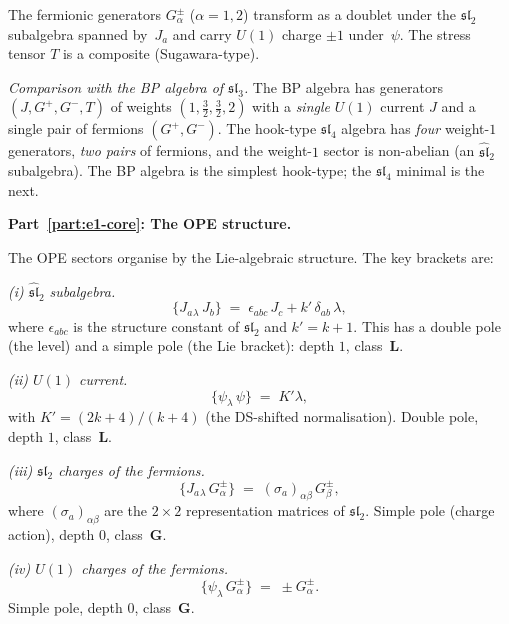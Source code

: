 \begin{computation}
The fermionic generators $G^\pm_\alpha$ ($\alpha = 1, 2$)
transform as a doublet under the $\mathfrak{sl}_2$
subalgebra spanned by~$J_a$ and carry $U(1)$ charge
$\pm 1$ under~$\psi$. The stress tensor $T$ is
a composite (Sugawara-type).

\emph{Comparison with the BP algebra of $\mathfrak{sl}_3$.}
The BP algebra has generators $(J, G^+, G^-, T)$ of
weights $(1, \frac32, \frac32, 2)$ with a \emph{single}
$U(1)$ current $J$ and a single pair of fermions
$(G^+, G^-)$. The hook-type $\mathfrak{sl}_4$ algebra
has \emph{four} weight-$1$ generators, \emph{two pairs}
of fermions, and the weight-$1$ sector is non-abelian
(an $\widehat{\mathfrak{sl}}_2$ subalgebra). The
BP algebra is the simplest hook-type; the
$\mathfrak{sl}_4$ minimal is the next.

\medskip
\noindent\textbf{Part~\ref{part:e1-core}: The OPE structure.}

The OPE sectors organise by the Lie-algebraic
structure. The key brackets are:

\smallskip
\noindent\emph{(i) $\widehat{\mathfrak{sl}}_2$ subalgebra.}
\begin{equation}\label{eq:sl4hook-JJ}
\{J_a{}_\lambda\, J_b\}
\;=\;
\epsilon_{abc}\, J_c
+ k'\,\delta_{ab}\,\lambda,
\end{equation}
where $\epsilon_{abc}$ is the structure constant of
$\mathfrak{sl}_2$ and $k' = k + 1$. This has a
double pole (the level) and a simple pole (the Lie
bracket): depth $1$, class~$\mathbf{L}$.

\smallskip
\noindent\emph{(ii) $U(1)$ current.}
\begin{equation}\label{eq:sl4hook-psipsi}
\{\psi_\lambda\, \psi\}
\;=\;
K'\lambda,
\end{equation}
with $K' = (2k+4)/(k+4)$ (the DS-shifted normalisation).
Double pole, depth $1$, class~$\mathbf{L}$.

\smallskip
\noindent\emph{(iii) $\mathfrak{sl}_2$ charges of the
fermions.}
\begin{equation}\label{eq:sl4hook-JG}
\{J_a{}_\lambda\, G^\pm_\alpha\}
\;=\;
(\sigma_a)_{\alpha\beta}\, G^\pm_\beta,
\end{equation}
where $(\sigma_a)_{\alpha\beta}$ are the $2\times 2$
representation matrices of $\mathfrak{sl}_2$.
Simple pole (charge action), depth $0$,
class~$\mathbf{G}$.

\smallskip
\noindent\emph{(iv) $U(1)$ charges of the fermions.}
\begin{equation}\label{eq:sl4hook-psiG}
\{\psi_\lambda\, G^\pm_\alpha\}
\;=\;
\pm G^\pm_\alpha.
\end{equation}
Simple pole, depth $0$, class~$\mathbf{G}$.


\end{computation}
